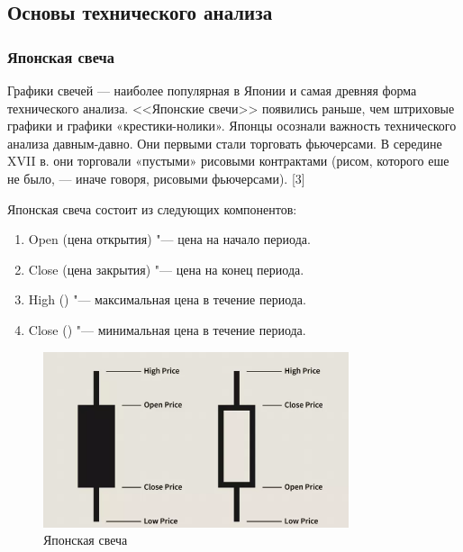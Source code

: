 \documentclass[bachelor, och, coursework]{SCWorks}
\begin{document}
        \subsection{Основы технического анализа}

            \subsubsection{Японская свеча}

            Графики свечей — наиболее популярная в Японии и самая древняя
            форма технического анализа. <<Японские свечи>> появились раньше, чем
            штриховые графики и графики «крестики-нолики». Японцы осознали важность 
            технического анализа давным-давно. Они первыми стали торговать
            фьючерсами. В середине XVII в. они торговали «пустыми» рисовыми 
            контрактами (рисом, которого еше не было, — иначе говоря, рисовыми 
            фьючерсами). [3]

            Японская свеча состоит из следующих компонентов: 
            \begin{enumerate}
                \item Open (цена открытия) "--- цена на начало периода.
                \item Close (цена закрытия) "--- цена на конец периода.
                \item High () "--- максимальная цена в течение периода.
                \item Close () "--- минимальная цена в течение периода.
            \end{enumerate}

            \begin{figure}[H]
                \centering
                \includegraphics[width=0.8\textwidth]{pic/candlestick.png}
                \caption{Японская свеча}
            \end{figure}
\end{document}
